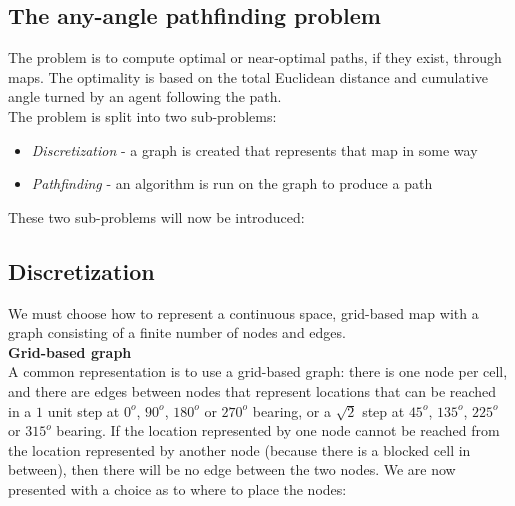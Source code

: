 \documentclass[12pt,notitlepage]{report}
\begin{document}
\subsection{The any-angle pathfinding problem}

The problem is to compute optimal or near-optimal paths, if they exist, through maps. The optimality is based on the total Euclidean distance and cumulative angle turned by an agent following the path. \\

\noindent
The problem is split into two sub-problems:
\begin{itemize}
\item {\em Discretization} - a graph is created that represents that map in some way
\item {\em Pathfinding} - an algorithm is run on the graph to produce a path
\end{itemize}

These two sub-problems will now be introduced:

\subsection{Discretization}

We must choose how to represent a continuous space, grid-based map with a graph consisting of a finite number of nodes and edges.\\

\noindent
{\bfseries Grid-based graph}\\

\noindent
A common representation is to use a grid-based graph: there is one node per cell, and there are edges between nodes that represent locations that can be reached in a {$1$} unit step at {$0^{o}$}, {$90^{o}$}, {$180^{o}$} or {$270^{o}$} bearing, or a {$\sqrt{2}$} step at {$45^{o}$}, {$135^{o}$}, {$225^{o}$} or {$315^{o}$} bearing. If the location represented by one node cannot be reached from the location represented by another node (because there is a blocked cell in between), then there will be no edge between the two nodes. We are now presented with a choice as to where to place the nodes:
\end{document}
